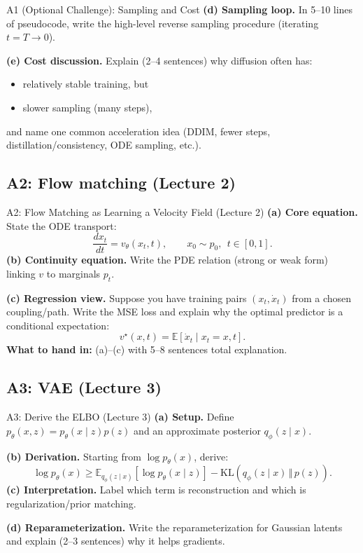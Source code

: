 \documentclass[aspectratio=169]{beamer}
\begin{document}
\begin{frame}{A1 (Optional Challenge): Sampling and Cost}
\small
\textbf{(d) Sampling loop.} In 5--10 lines of pseudocode, write the high-level reverse sampling procedure (iterating $t=T\to 0$).
\vspace{0.4em}

\textbf{(e) Cost discussion.} Explain (2--4 sentences) why diffusion often has:
\begin{itemize}
  \item relatively stable training, but
  \item slower sampling (many steps),
\end{itemize}
and name one common acceleration idea (DDIM, fewer steps, distillation/consistency, ODE sampling, etc.).
\end{frame}

\subsection{A2: Flow matching (Lecture 2)}

\begin{frame}{A2: Flow Matching as Learning a Velocity Field (Lecture 2)}
\small
\textbf{(a) Core equation.} State the ODE transport:
\[
\frac{d x_t}{dt}=v_\theta(x_t,t),\qquad x_0\sim p_0,\ \ t\in[0,1].
\]
\textbf{(b) Continuity equation.} Write the PDE relation (strong or weak form) linking $v$ to marginals $p_t$.
\vspace{0.5em}

\textbf{(c) Regression view.} Suppose you have training pairs $(x_t,\dot x_t)$ from a chosen coupling/path.
Write the MSE loss and explain why the optimal predictor is a conditional expectation:
\[
v^\star(x,t)=\mathbb{E}[\dot x_t \mid x_t=x, t].
\]
\textbf{What to hand in:} (a)--(c) with 5--8 sentences total explanation.
\end{frame}

\subsection{A3: VAE (Lecture 3)}

\begin{frame}{A3: Derive the ELBO (Lecture 3)}
\small
\textbf{(a) Setup.} Define $p_\theta(x,z)=p_\theta(x\mid z)p(z)$ and an approximate posterior $q_\phi(z\mid x)$.
\vspace{0.4em}

\textbf{(b) Derivation.} Starting from $\log p_\theta(x)$, derive:
\[
\log p_\theta(x) \ge \mathbb{E}_{q_\phi(z\mid x)}[\log p_\theta(x\mid z)]-\mathrm{KL}\!\left(q_\phi(z\mid x)\,\Vert\,p(z)\right).
\]
\textbf{(c) Interpretation.} Label which term is reconstruction and which is regularization/prior matching.
\vspace{0.4em}

\textbf{(d) Reparameterization.} Write the reparameterization for Gaussian latents and explain (2--3 sentences) why it helps gradients.
\end{frame}
\end{document}
